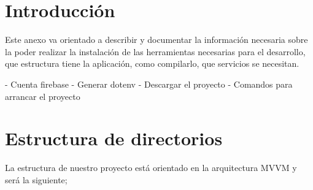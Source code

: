 
\section{Introducción}

Este anexo va orientado a describir y documentar la información necesaria sobre la poder realizar la instalación de las herramientas necesarias para el desarrollo, que estructura tiene la aplicación, como compilarlo, que servicios se necesitan.

- Cuenta firebase
- Generar dotenv
- Descargar el proyecto
- Comandos para arrancar el proyecto

\section{Estructura de directorios}
La estructura de nuestro proyecto está orientado en la arquitectura MVVM y será la siguiente;


